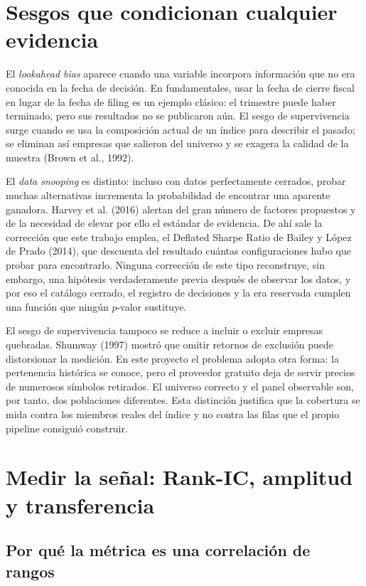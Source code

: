 \section{Sesgos que condicionan cualquier evidencia}

El \textit{lookahead bias} aparece cuando una variable incorpora información que no era conocida en
la fecha de decisión. En fundamentales, usar la fecha de cierre fiscal en lugar de la fecha de filing
es un ejemplo clásico: el trimestre puede haber terminado, pero sus resultados no se publicaron
aún. El sesgo de supervivencia surge cuando se usa la composición actual de un índice para describir
el pasado; se eliminan así empresas que salieron del universo y se exagera la calidad de la muestra
(Brown et al., 1992).

El \textit{data snooping} es distinto: incluso con datos perfectamente cerrados, probar muchas
alternativas incrementa la probabilidad de encontrar una aparente ganadora. Harvey et al. (2016)
alertan del gran número de factores propuestos y de la necesidad de elevar por ello el estándar de
evidencia. De ahí sale la corrección que este trabajo emplea, el Deflated Sharpe Ratio de Bailey y
López de Prado (2014), que descuenta del resultado cuántas configuraciones hubo que probar para
encontrarlo. Ninguna corrección de este tipo reconstruye, sin embargo, una hipótesis verdaderamente
previa después de observar los datos, y por eso el catálogo cerrado, el registro de decisiones y la
era reservada cumplen una función que ningún $p$-valor sustituye.

El sesgo de supervivencia tampoco se reduce a incluir o excluir empresas quebradas. Shumway (1997)
mostró que omitir retornos de exclusión puede distorsionar la medición. En este proyecto el problema
adopta otra forma: la pertenencia histórica se conoce, pero el proveedor gratuito deja de servir
precios de numerosos símbolos retirados. El universo correcto y el panel observable son, por tanto,
dos poblaciones diferentes. Esta distinción justifica que la cobertura se mida contra los miembros
reales del índice y no contra las filas que el propio pipeline consiguió construir.

\section{Medir la señal: Rank-IC, amplitud y transferencia}

\subsection{Por qué la métrica es una correlación de rangos}

